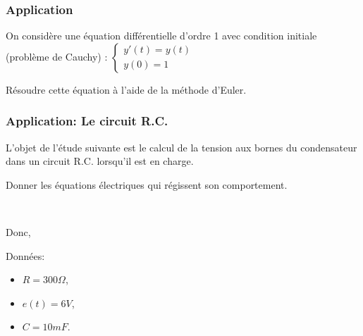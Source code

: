 \begin{frame}[fragile]
\frametitle{Application}

On considère une équation différentielle d'ordre 1 avec condition initiale (problème de Cauchy) :
$\left\{\begin{array}{l}
y'(t) = y(t) \\
y(0) = 1
\end{array}\right.$

Résoudre cette équation à l'aide de la méthode d'Euler.
\begin{GrayBox}[0.85\textwidth]
\begin{semiverbatim}\small
{}
\end{semiverbatim}
\end{GrayBox}
\end{frame}

\begin{frame}[fragile]
\frametitle{Application: Le circuit R.C.}

L'objet de l'étude suivante est le calcul de la tension aux bornes du condensateur dans un circuit R.C. lorsqu'il est en charge.

Donner les équations électriques qui régissent son comportement.

~\

Donc, 

Données:
\begin{itemize}
 \item $R=300\Omega$,
 \item $e(t)=6V$,
 \item $C=10mF$.
\end{itemize}
\end{frame}



